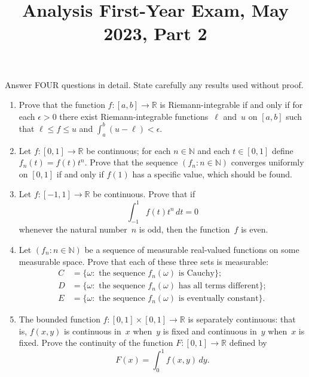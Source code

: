 \documentclass[11pt,letterpaper]{article}
\title{Analysis First-Year Exam, May 2023, Part 2}
\author{}
\date{}
\newenvironment{examproblems}[2]{%
  \def\ProblemHeadingTag{#2}%
  \AssignTaggingSocketPlug{block/list/label}{examproblem}%
  \begin{enumerate}%
  \setcounter{enumi}{#1}%
  \renewcommand{\labelenumi}{\textbf{\theenumi.}}%
  \setlength{\topsep}{0.35em}%
  \setlength{\partopsep}{0pt}%
  \setlength{\itemsep}{0.48em}%
  \setlength{\parsep}{0.18em}%
}{\end{enumerate}}
\newenvironment{examinstructions}{%
  \par\begingroup\itshape
}{%
  \par\endgroup\vspace{0.18em}
}
\begin{document}
\maketitle
\thispagestyle{empty}
\begin{examinstructions}
Answer FOUR questions in detail. State carefully any results used without proof.
\end{examinstructions}
\begin{examproblems}{0}{H2}
\def\ProblemHeadingText{Problem 1.}
\item
Prove that the function \(f:[a,b]\to\mathbb{R}\) is Riemann-integrable if and only if for each \(\epsilon>0\) there exist Riemann-integrable functions~\(\ell\) and~\(u\) on \([a,b]\) such that \(\ell\leq f\leq u\) and \(\int_a^b(u-\ell)<\epsilon\).
\def\ProblemHeadingText{Problem 2.}
\item
Let \(f:[0,1]\to\mathbb{R}\) be continuous; for each \(n\in\mathbb{N}\) and each \(t\in[0,1]\) define \(f_n(t)=f(t)t^n\). Prove that the sequence \((f_n:n\in\mathbb{N})\) converges uniformly on \([0,1]\) if and only if \(f(1)\) has a specific value, which should be found.
\def\ProblemHeadingText{Problem 3.}
\item
Let \(f:[-1,1]\to\mathbb{R}\) be continuous. Prove that if
\[
\int_{-1}^1 f(t)t^n\,dt=0
\]
 whenever the natural number~\(n\) is odd, then the function~\(f\) is even.
\def\ProblemHeadingText{Problem 4.}
\item
Let \((f_n:n\in\mathbb{N})\) be a sequence of measurable real-valued functions on some measurable space. Prove that each of these three sets is measurable:
\[
\begin{aligned}
C&=\{\omega:\text{ the sequence }f_n(\omega)\text{ is Cauchy}\};\\
D&=\{\omega:\text{ the sequence }f_n(\omega)\text{ has all terms different}\};\\
E&=\{\omega:\text{ the sequence }f_n(\omega)\text{ is eventually constant}\}.
\end{aligned}
\]
\def\ProblemHeadingText{Problem 5.}
\item
The bounded function \(f:[0,1]\times[0,1]\to\mathbb{R}\) is separately continuous: that is, \(f(x,y)\) is continuous in~\(x\) when~\(y\) is fixed and continuous in~\(y\) when~\(x\) is fixed. Prove the continuity of the function \(F:[0,1]\to\mathbb{R}\) defined by
\[
F(x)=\int_0^1 f(x,y)\,dy.
\]
\end{examproblems}
\end{document}
